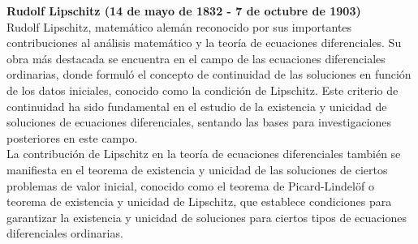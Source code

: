 \begin{mdframed}[style=warning]
	\begin{tcolorbox}[arc=0mm,boxrule=0pt,colframe=white,colback=lightgray!25]
		{\large \textbf{Rudolf Lipschitz (14 de mayo de 1832 - 7 de octubre de 1903)}} \\
		Rudolf Lipschitz, matemático alemán reconocido por sus importantes contribuciones al análisis matemático y la teoría de ecuaciones diferenciales. Su obra más destacada se encuentra en el campo de las ecuaciones diferenciales ordinarias, donde formuló el concepto de continuidad de las soluciones en función de los datos iniciales, conocido como la condición de Lipschitz. Este criterio de continuidad ha sido fundamental en el estudio de la existencia y unicidad de soluciones de ecuaciones diferenciales, sentando las bases para investigaciones posteriores en este campo. \\
		
		La contribución de Lipschitz en la teoría de ecuaciones diferenciales también se manifiesta en el teorema de existencia y unicidad de las soluciones de ciertos problemas de valor inicial, conocido como el teorema de Picard-Lindelöf o teorema de existencia y unicidad de Lipschitz, que establece condiciones para garantizar la existencia y unicidad de soluciones para ciertos tipos de ecuaciones diferenciales ordinarias.
	\end{tcolorbox}
\end{mdframed}






















































